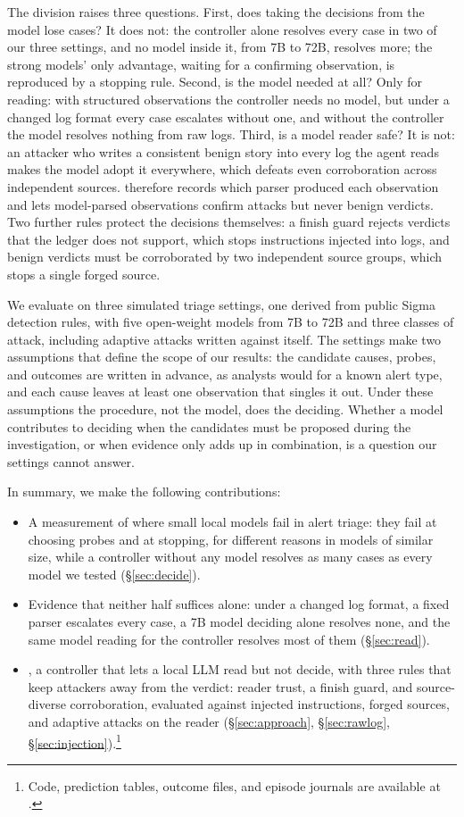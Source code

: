 The division raises three questions. First, does taking the decisions from the model lose cases? It does not: the controller alone resolves every case in two of our three settings, and no model inside it, from 7B to 72B, resolves more; the strong models' only advantage, waiting for a confirming observation, is reproduced by a stopping rule. Second, is the model needed at all? Only for reading: with structured observations the controller needs no model, but under a changed log format every case escalates without one, and without the controller the model resolves nothing from raw logs. Third, is a model reader safe? It is not: an attacker who writes a consistent benign story into every log the agent reads makes the model adopt it everywhere, which defeats even corroboration across independent sources. \hesp{} therefore records which parser produced each observation and lets model-parsed observations confirm attacks but never benign verdicts. Two further rules protect the decisions themselves: a finish guard rejects verdicts that the ledger does not support, which stops instructions injected into logs, and benign verdicts must be corroborated by two independent source groups, which stops a single forged source.

We evaluate \hesp{} on three simulated triage settings, one derived from public Sigma detection rules, with five open-weight models from 7B to 72B and three classes of attack, including adaptive attacks written against \hesp{} itself. The settings make two assumptions that define the scope of our results: the candidate causes, probes, and outcomes are written in advance, as analysts would for a known alert type, and each cause leaves at least one observation that singles it out. Under these assumptions the procedure, not the model, does the deciding. Whether a model contributes to deciding when the candidates must be proposed during the investigation, or when evidence only adds up in combination, is a question our settings cannot answer.

In summary, we make the following contributions:
\begin{itemize}
  \item A measurement of where small local models fail in alert triage: they fail at choosing probes and at stopping, for different reasons in models of similar size, while a controller without any model resolves as many cases as every model we tested (\S\ref{sec:decide}).
  \item Evidence that neither half suffices alone: under a changed log format, a fixed parser escalates every case, a 7B model deciding alone resolves none, and the same model reading for the controller resolves most of them (\S\ref{sec:read}).
  \item \hesp{}, a controller that lets a local LLM read but not decide, with three rules that keep attackers away from the verdict: reader trust, a finish guard, and source-diverse corroboration, evaluated against injected instructions, forged sources, and adaptive attacks on the reader (\S\ref{sec:approach}, \S\ref{sec:rawlog}, \S\ref{sec:injection}).\footnote{Code, prediction tables, outcome files, and episode journals are available at \repourl.}
\end{itemize}
